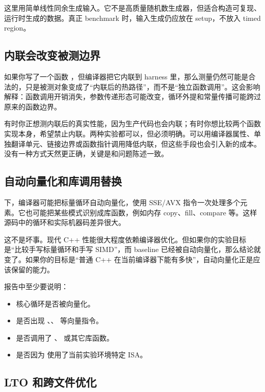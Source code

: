 这里用简单线性同余生成输入。它不是高质量随机数生成器，但适合构造可复现、运行时生成的数据。真正 benchmark 时，输入生成仍应放在 setup，不放入 timed region。

\subsection{内联会改变被测边界}

如果你写了一个函数 ，但编译器把它内联到 harness 里，那么测量仍然可能是合法的，只是被测对象变成了“内联后的热路径”，而不是“独立函数调用”。这会影响解释：函数调用开销消失，参数传递形态可能改变，循环外提和常量传播可能跨过原来的函数边界。

有时你正想测内联后的真实性能，因为生产代码也会内联；有时你想比较两个函数实现本身，希望禁止内联。两种实验都可以，但必须明确。可以用编译器属性、单独翻译单元、链接边界或函数指针调用降低内联，但这些手段也会引入新的成本。没有一种方式天然更正确，关键是和问题陈述一致。

\subsection{自动向量化和库调用替换}

 下，编译器可能把标量循环自动向量化，使用 SSE/AVX 指令一次处理多个元素。它也可能把某些模式识别成库函数，例如内存 copy、fill、compare 等。这样源码中的循环和实际机器码差异很大。

这不是坏事。现代 C++ 性能很大程度依赖编译器优化。但如果你的实验目标是“比较手写标量循环和手写 SIMD”，而 baseline 已经被自动向量化，那么结论就变了。如果你的目标是“普通 C++ 在当前编译器下能有多快”，自动向量化正是应该保留的能力。

报告中至少要说明：

\begin{itemize}
  \item 核心循环是否被向量化。
  \item 是否出现 、、 等向量指令。
  \item 是否调用了 、 或其它库函数。
  \item 是否因为  使用了当前实验环境特定 ISA。
\end{itemize}

\subsection{LTO 和跨文件优化}

